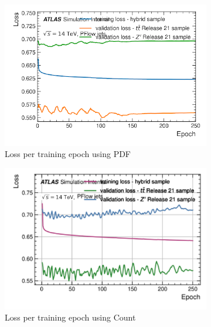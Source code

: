 \begin{figure}[H]
    \centering
    \begin{subfigure}{0.45\textwidth}
        \centering
        \includegraphics[width=\textwidth]{figs/ch5/lossvepoch_pdf.png}
        \caption{Loss per training epoch using PDF}
        \label{fig:vepocha}
    \end{subfigure}
    \begin{subfigure}{0.45\textwidth}
        \centering
        \includegraphics[width=\textwidth]{figs/ch5/lossvepoch_count.png}
        \caption{Loss per training epoch using Count}
        \label{fig:vepochb}
    \end{subfigure}
    \begin{subfigure}{0.45\textwidth}
        \centering

\end{subfigure}
\end{figure}
